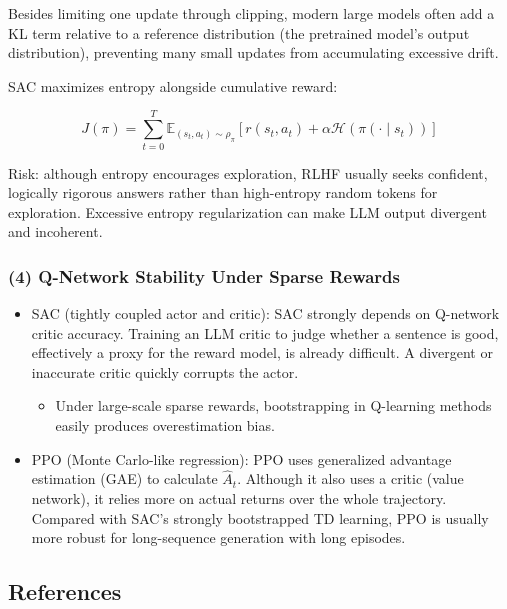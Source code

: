 Besides limiting one update through clipping, modern large models often add a KL term relative to a reference distribution (the pretrained model's output distribution), preventing many small updates from accumulating excessive drift.

SAC maximizes entropy alongside cumulative reward:

\[
J(\pi)
=
\sum_{t=0}^{T}
\mathbb{E}_{(s_t,a_t)\sim\rho_\pi}
\left[
r(s_t,a_t)
+\alpha\mathcal{H}(\pi(\cdot\mid s_t))
\right]
\]

Risk: although entropy encourages exploration, RLHF usually seeks confident, logically rigorous answers rather than high-entropy random tokens for exploration. Excessive entropy regularization can make LLM output divergent and incoherent.

\hypertarget{q-network-stability-under-sparse-rewards}{%
\subsubsection{(4) Q-Network Stability Under Sparse Rewards}\label{q-network-stability-under-sparse-rewards}}

\begin{itemize}
\tightlist
\item
  SAC (tightly coupled actor and critic): SAC strongly depends on Q-network critic accuracy. Training an LLM critic to judge whether a sentence is good, effectively a proxy for the reward model, is already difficult. A divergent or inaccurate critic quickly corrupts the actor.

  \begin{itemize}
  \tightlist
  \item
    Under large-scale sparse rewards, bootstrapping in Q-learning methods easily produces overestimation bias.
  \end{itemize}
\item
  PPO (Monte Carlo-like regression): PPO uses generalized advantage estimation (GAE) to calculate \(\hat{A}_t\). Although it also uses a critic (value network), it relies more on actual returns over the whole trajectory. Compared with SAC's strongly bootstrapped TD learning, PPO is usually more robust for long-sequence generation with long episodes.
\end{itemize}

\FloatBarrier
{}
\hypertarget{references-84}{%
\subsection{References}\label{references-84}}

